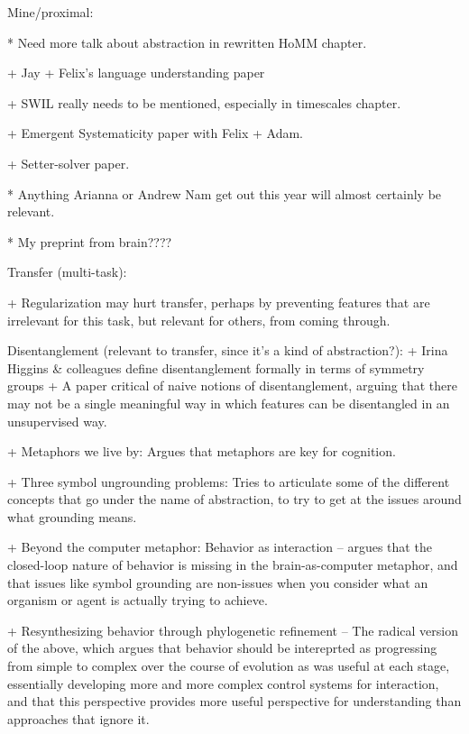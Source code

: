 Mine/proximal:

* Need more talk about abstraction in rewritten HoMM chapter.

+ Jay + Felix's language understanding paper

+ SWIL really needs to be mentioned, especially in timescales chapter.

+ Emergent Systematicity paper with Felix + Adam.

+ Setter-solver paper.

* Anything Arianna or Andrew Nam get out this year will almost certainly be relevant.

* My preprint from brain????


Transfer (multi-task):

+ Regularization may hurt transfer, perhaps by preventing features that are irrelevant for this task, but relevant for others, from coming through. \citep{Kornblith2019} 

    Disentanglement (relevant to transfer, since it's a kind of abstraction?):
        + Irina Higgins & colleagues define disentanglement formally in terms of symmetry groups \citep{Higgins2018}
        + A paper critical of naive notions of disentanglement, arguing that there may not be a single meaningful way in which features can be disentangled in an unsupervised way. \citep{Locatello2019}

+ Metaphors we live by: Argues that metaphors are key for cognition. \citep{Lakoff2008} 

+ Three symbol ungrounding problems: Tries to articulate some of the different concepts that go under the name of abstraction, to try to get at the issues around what grounding means. \citep{Dove2016}

+ Beyond the computer metaphor: Behavior as interaction -- argues that the closed-loop nature of behavior is missing in the brain-as-computer metaphor, and that issues like symbol grounding are non-issues when you consider what an organism or agent is actually trying to achieve. \citep{Cisek1999}

+ Resynthesizing behavior through phylogenetic refinement -- The radical version of the above, which argues that behavior should be intereprted as progressing from simple to complex over the course of evolution as was useful at each stage, essentially developing more and more complex control systems for interaction, and that this perspective provides more useful perspective for understanding than approaches that ignore it. \citep{Cisek2019}

